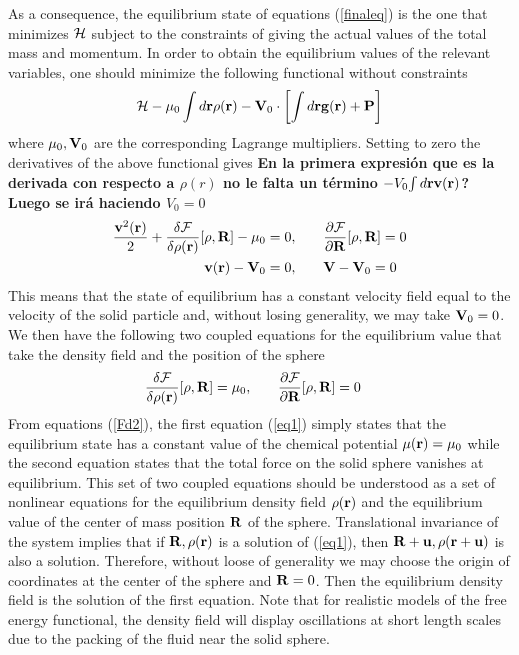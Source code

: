 \documentclass[b5paper,openright,10pt]{book}
\newcommand{\Note}[1]{{\bf \color{red}#1}}    %
\begin{document}
As a consequence, the equilibrium state of equations (\ref{finaleq}) is the
one that minimizes ${\cal H}$ subject to the constraints of giving the
actual values of the total mass  and momentum.  In order to obtain the
equilibrium values of  the relevant variables, one  should minimize the
following functional without constraints
\begin{align}
  {\cal H}-\mu_0\int d{\bf r} \rho({\bf r})-{\bf V}_0\cdot\left[\int d{\bf r}{\bf g}({\bf r})+{\bf P}\right]
\end{align}
where    $\mu_0,{\bf   V}_0$    are    the   corresponding    Lagrange
multipliers. Setting  to zero the derivatives of  the above functional
gives  \Note{En la primera expresión que es la derivada con respecto a $\rho(r)$ no le falta un término $-V_0{\int d{\bf r}\bf v(r)}$? Luego se irá haciendo $V_0=0$}
\begin{align}
  \frac{{\bf v}^2({\bf r})}{2}
+\frac{\delta {\cal F}}{\delta\rho({\bf r})}[\rho,{\bf R}]-\mu_0&=0,\quad
&&\frac{\partial {\cal F}}{\partial {\bf R}}[\rho,{\bf R}]=0
\nonumber\\
{\bf v}({\bf r})-{\bf V}_0&=0,\quad
&&{\bf V}-{\bf V}_0=0
\label{eq01}
\end{align}
This means that the state of equilibrium has a constant velocity field
equal  to the  velocity  of  the solid  particle  and, without  losing
generality, we may take ${\bf V}_0=0$.  We then have the following two
coupled  equations for  the equilibrium  value that  take the  density
field and the position of the sphere
\begin{align}
\frac{\delta {\cal F}}{\delta\rho({\bf r})}[\rho,{\bf R}]&=\mu_0,\quad
&&
\frac{\partial {\cal F}}{\partial {\bf R}}[\rho,{\bf R}]=0
\label{eq1}
\end{align}
From equations   (\ref{Fd2}), the first equation  (\ref{eq1}) simply states
that  the equilibrium  state  has  a constant  value  of the  chemical
potential $\mu({\bf  r})=\mu_0$ while the second  equation states that
the total force on the solid  sphere vanishes at equilibrium. This set
of two  coupled equations should be  understood as a set  of nonlinear
equations for  the equilibrium density  field $\rho({\bf r})$  and the
equilibrium value of the center  of mass position ${\bf R}$ of the sphere.  Translational
invariance of the system implies that  if ${\bf R},\rho({\bf r})$ is a
solution of (\ref{eq1}), then  ${\bf R}+{\bf u},\rho({\bf r}+{\bf u})$
is also  a solution.   Therefore, without loose  of generality  we may
choose the origin of coordinates at the center of the sphere and ${\bf
  R}=0$. Then  the equilibrium  density field is  the solution  of the
first equation.   Note that  for realistic models  of the  free energy
functional,  the  density field  will  display  oscillations at  short
length scales due  to the packing of the fluid  near the solid sphere.
\end{document}
